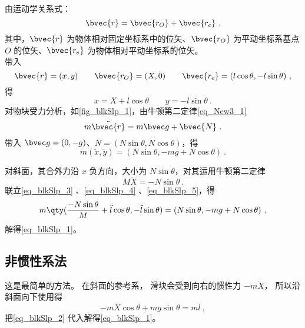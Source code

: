 由运动学关系式：
\begin{equation}
\bvec{r}=\bvec{r_{O}}+\bvec{r_{e}}~.
\end{equation}
其中，$\bvec{r}$ 为物体相对固定坐标系中的位矢、$\bvec{r_{O}}$ 为平动坐标系基点 $O$ 的位矢、$\bvec{r_{e}}$ 为物体相对平动坐标系的位矢。\\
带入
\begin{equation}
\bvec{r}=(x,y)\qquad \bvec{r_O}=(X,0)\qquad \bvec{r_e}=(l\cos\theta,-l\sin\theta)~,
\end{equation}
得
\begin{equation}\label{eq_blkSlp_3}
x=X+l\cos\theta \qquad y=-l\sin\theta~.
\end{equation}
对物块受力分析，如\autoref{fig_blkSlp_1}，由牛顿第二定律\autoref{eq_New3_1} 
\begin{equation}
m\ddot{\bvec{r}}=m\bvec g+\bvec{N}~.
\end{equation}
带入 $\bvec g=(0,-g)$、$N=(N\sin\theta,N\cos\theta)$，得
\begin{equation}\label{eq_blkSlp_4}
m(\ddot x,\ddot y)=(N\sin\theta,-mg+N\cos\theta)~.
\end{equation}

对斜面，其合外力沿 $x$ 负方向，大小为 $N\sin\theta$，对其运用牛顿第二定律
\begin{equation}\label{eq_blkSlp_5}
M\ddot X=-N\sin \theta~.
\end{equation}
联立\autoref{eq_blkSlp_3} 、\autoref{eq_blkSlp_4} 、\autoref{eq_blkSlp_5}，得
\begin{equation}
m\qty(\frac{-N\sin\theta}{M}+\ddot l\cos\theta,-\ddot l\sin\theta)=(N\sin\theta,-mg+N\cos\theta)~,
\end{equation}
解得\autoref{eq_blkSlp_1}。

\subsection{非惯性系法}
这是最简单的方法。 在斜面的参考系， 滑块会受到向右的惯性力 $-m\ddot X$， 所以沿斜面向下使用得
\begin{equation}
-m\ddot X\cos\theta + mg\sin\theta = m\ddot l~,
\end{equation}
把\autoref{eq_blkSlp_2} 代入解得\autoref{eq_blkSlp_1}。

